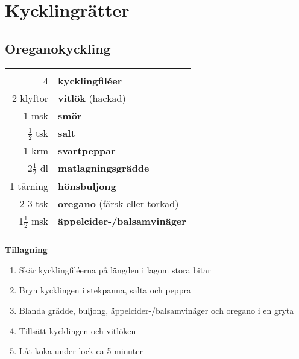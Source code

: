 
\section{Kycklingrätter}

\clearpage

\subsection{Oreganokyckling}

\begin{table}[H]
	\begin{tabular}{rl}
	\hline
	&\\
		4 & \textbf{kycklingfiléer}\\
		2 klyftor & \textbf{vitlök} (hackad)\\
		1 msk & \textbf{smör}\\
		$\frac{1}{2}$ tsk & \textbf{salt}\\
		1 krm & \textbf{svartpeppar}\\
		2$\frac{1}{2}$ dl & \textbf{matlagningsgrädde}\\
		1 tärning & \textbf{hönsbuljong}\\
		2-3 tsk & \textbf{oregano} (färsk eller torkad)\\
		1$\frac{1}{2}$ msk & \textbf{äppelcider-/balsamvinäger}\\
	&\\
	\hline
	\end{tabular}
\end{table}


\begin{multicols*}{2}

\noindent \textbf{Tillagning}
\begin{enumerate}
	\itemsep0cm
	\item Skär kycklingfiléerna på \mbox{längden} i lagom stora bitar
	\item Bryn kycklingen i stekpanna, salta och peppra
	\item Blanda grädde, buljong, äppelcider-/balsamvinäger och oregano i en gryta
	\item Tillsätt kycklingen och vitlöken
	\item Låt koka under lock ca 5 \mbox{minuter}
\end{enumerate}

\end{multicols*}

